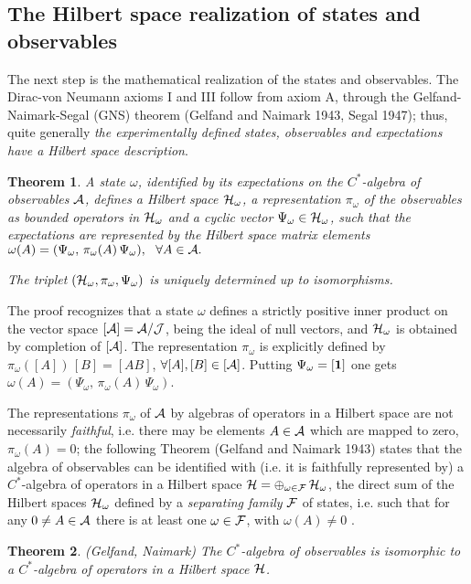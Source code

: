 \documentclass[12pt]{article}
\newtheorem{Theorem}{Theorem}[section]
\def \om {{\omega}}
\def \A {{\cal A}}
\def \F {{\cal F}}
\def \H {\mbox{${\cal H}$}}
\def \J {{\cal J}}
\def \id {{\bf 1 }}
\begin{document}
\subsection{The Hilbert space realization of states and observables}
The next step is the mathematical realization of the states and observables. 
The Dirac-von Neumann axioms I and III follow from axiom A, through the 
Gelfand-Naimark-Segal (GNS) theorem (Gelfand and Naimark 1943, Segal 1947); thus, 
 quite generally {\em the experimentally defined states, 
observables and expectations have a Hilbert space description}. 


\def \ho {\H_\om}
\def \po {\pi_\om}
\def \pso {\Psi_\om} 

\begin{Theorem}
 A state $\om$, identified by its  expectations 
on the $C^*$-al\-ge\-bra of observables  $\A$, defines a Hilbert space $\H_\om$, 
 a representation $\pi_\om $ of the observables as bounded operators in $\H_\om$   and a cyclic vector $\Psi_\om \in \H_\om$, such that the expectations are represented by the Hilbert space matrix elements $ \om(A) = (\pso, \,\po(A)\,\pso), \,\,\,\,\forall A \in \A.$

\noindent The triplet $(\ho, \po, \pso)$ is uniquely determined up to isomorphisms.
\end{Theorem}

The proof recognizes that a state $\omega$ defines a strictly positive inner product on the vector space $[\A] = \A/\J$, being the ideal of null vectors, and $\H_\om$ is obtained by completion of $[\A]$. The representation $\pi_\om$ is explicitly defined by $\pi_\om([A]) \,[B] = [AB]$, $\forall [A], [B] \in [\A]$. Putting $\Psi_\om = [\id]$ one gets $ \om(A) = (\pso, \,\po(A)\,\pso)$.    

The representations $\po$  of $\A$ by algebras of operators in a Hilbert space are not necessarily {\em faithful}, i.e. there may be elements  $A \in \A$ which are mapped to zero, $\po(A)=0$; the following   Theorem (Gelfand and Naimark 1943) states that the algebra of observables can be identified with (i.e. it is faithfully represented by)   a $C^*$-algebra of operators in a Hilbert space $\H = \oplus_{\om \in \F}\,\ho$,  the    
direct sum of the Hilbert spaces $\ho$ defined by a {\em separating family} $\F$ of states, i.e. such that for any $0 \neq A \in \A$ there is at least one $\om \in \F$, with $\om(A) \neq 0$ .
\begin{Theorem}(Gelfand, Naimark) The $C^*$-algebra of observables is isomorphic to a $C^*$-algebra of  operators in a Hilbert space $\H$.
\end{Theorem} 
\end{document}
